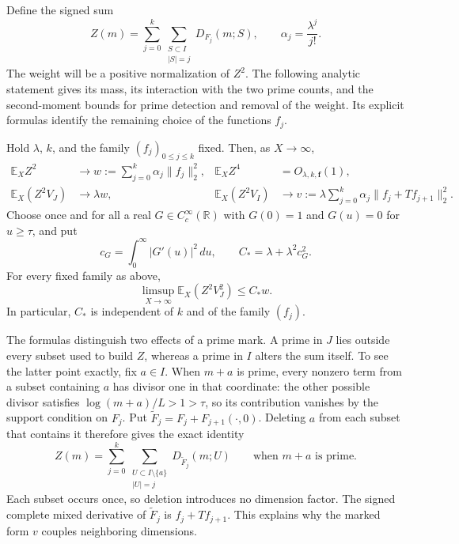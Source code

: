 Define the signed sum
\[
 Z(m)=\sum_{j=0}^k\sum_{\substack{S\subset I\\|S|=j}}D_{F_j}(m;S),
 \qquad \alpha_j=\frac{\lambda^j}{j!}.
\]
The weight will be a positive normalization of $Z^2$. The following
analytic statement gives its mass, its interaction with the two prime
counts, and the second-moment bounds for prime detection and removal
of the weight. Its explicit formulas identify the remaining choice
of the functions $f_j$.

\begin{proposition}
\label{prop:weight-moments}
Hold $\lambda$, $k$, and the family $(f_j)_{0\le j\le k}$ fixed.
Then, as $X\to\infty$,
\begin{align}
 \mathbb E_XZ^2&\longrightarrow
       w:=\sum_{j=0}^k\alpha_j\|f_j\|_2^2,
       &\mathbb E_XZ^4&=O_{\lambda,k,\mathbf f}(1),
       \label{eq:weight-unmarked}\\
 \mathbb E_X(Z^2V_J)&\longrightarrow\lambda w,
       &\mathbb E_X(Z^2V_I)&\longrightarrow
       v:=\lambda\sum_{j=0}^k\alpha_j
                         \|f_j+Tf_{j+1}\|_2^2.
       \label{eq:weight-marked}
\end{align}
Choose once and for all a real $G\in C_c^\infty(\mathbb R)$ with
$G(0)=1$ and $G(u)=0$ for $u\ge\tau$, and put
\[
 c_G=\int_0^\infty |G'(u)|^2\,du,
 \qquad C_*=\lambda+\lambda^2c_G^2.
\]
For every fixed family as above,
\begin{equation}
 \limsup_{X\to\infty}\mathbb E_X(Z^2V_J^2)\le C_*w.
 \label{eq:detector-bound}
\end{equation}
In particular, $C_*$ is independent of $k$ and of the family $(f_j)$.
\end{proposition}

The formulas distinguish two effects of a prime mark. A prime in $J$
lies outside every subset used to build $Z$, whereas a prime in $I$
alters the sum itself. To see the latter point exactly, fix $a\in I$.
When $m+a$ is prime, every nonzero term from a subset containing $a$
has divisor one in that coordinate: the other possible divisor satisfies
$\log(m+a)/L>1>\tau$, so its contribution vanishes by the support
condition on $F_j$.
Put $\widetilde F_j=F_j+F_{j+1}(\cdot,0)$. Deleting $a$ from each
subset that contains it therefore gives the exact identity
\begin{equation}\label{eq:prime-deletion}
 Z(m)=\sum_{j=0}^k
       \sum_{\substack{U\subset I\setminus\{a\}\\|U|=j}}
       D_{\widetilde F_j}(m;U)
 \qquad\text{when $m+a$ is prime}.
\end{equation}
Each subset occurs once, so deletion introduces no dimension factor.
The signed complete mixed derivative of $\widetilde F_j$ is
$f_j+Tf_{j+1}$. This explains why the marked form $v$ couples neighboring
dimensions.

